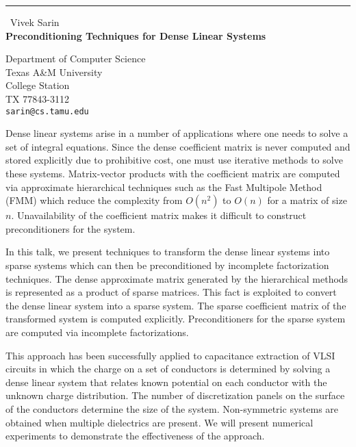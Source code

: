 \documentclass{report}
\begin{document}
\begin{center}
\rule{6in}{1pt} \
{\large Vivek Sarin \\
{\bf Preconditioning Techniques for Dense Linear Systems}}

Department of Computer Science \\ Texas A\&M University \\ College Station \\ TX 77843-3112
\\
{\tt sarin@cs.tamu.edu}\end{center}

Dense linear systems arise in a number of applications where one needs to
solve a set of integral equations. Since the dense coefficient matrix is
never computed and stored explicitly due to prohibitive cost, one must
use iterative methods to solve these systems. Matrix-vector products with
the coefficient matrix are computed via approximate hierarchical
techniques such as the Fast Multipole Method (FMM) which reduce the
complexity from $O(n^2)$ to $O(n)$ for a matrix of size $n$.
Unavailability of the coefficient matrix makes it difficult to construct
preconditioners for the system.

In this talk, we present techniques to transform the dense linear systems
into sparse systems which can then be preconditioned by incomplete
factorization techniques. The dense approximate matrix generated by the
hierarchical methods is represented as a product of sparse matrices. This
fact is exploited to convert the dense linear system into a sparse
system. The sparse coefficient matrix of the transformed system is
computed explicitly. Preconditioners for the sparse system are computed
via incomplete factorizations.

This approach has been successfully applied to capacitance extraction of
VLSI circuits in which the charge on a set of conductors is determined by
solving a dense linear system that relates known potential on each
conductor with the unknown charge distribution. The number of
discretization panels on the surface of the conductors determine the size
of the system. Non-symmetric systems are obtained when multiple
dielectrics are present. We will present numerical experiments to
demonstrate the effectiveness of the approach.
\end{document}
